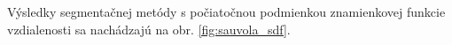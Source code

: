 \documentclass[a4paper,11pt,oneside]{article}%
\begin{document}
Výsledky segmentačnej metódy s počiatočnou podmienkou znamienkovej funkcie vzdialenosti sa nachádzajú na obr. \ref{fig:sauvola_sdf}.

\begin{figure}[H]  
    \hspace{5px}

\end{figure}
\end{document}
